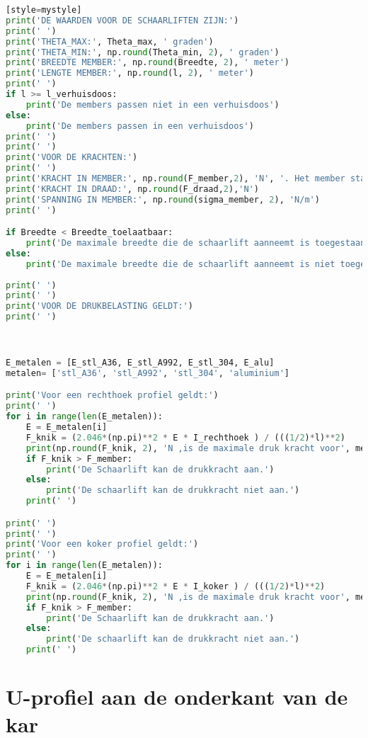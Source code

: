 \begin{lstlisting}[language=Python][style=mystyle]
print('DE WAARDEN VOOR DE SCHAARLIFTEN ZIJN:')
print(' ')
print('THETA_MAX:', Theta_max, ' graden')
print('THETA_MIN:', np.round(Theta_min, 2), ' graden')
print('BREEDTE MEMBER:', np.round(Breedte, 2), ' meter')
print('LENGTE MEMBER:', np.round(l, 2), ' meter')
print(' ')
if l >= l_verhuisdoos:
    print('De members passen niet in een verhuisdoos')
else:
    print('De members passen in een verhuisdoos')
print(' ')
print(' ')
print('VOOR DE KRACHTEN:')
print(' ')
print('KRACHT IN MEMBER:', np.round(F_member,2), 'N', '. Het member staat in druk.')
print('KRACHT IN DRAAD:', np.round(F_draad,2),'N')
print('SPANNING IN MEMBER:', np.round(sigma_member, 2), 'N/m')
print(' ')

if Breedte < Breedte_toelaatbaar:
    print('De maximale breedte die de schaarlift aanneemt is toegestaan.')
else:
    print('De maximale breedte die de schaarlift aanneemt is niet toegestaan')
    
print(' ')
print(' ')
print('VOOR DE DRUKBELASTING GELDT:')
print(' ')



E_metalen = [E_stl_A36, E_stl_A992, E_stl_304, E_alu]
metalen= ['stl_A36', 'stl_A992', 'stl_304', 'aluminium']

print('Voor een rechthoek profiel geldt:')
print(' ')
for i in range(len(E_metalen)):
    E = E_metalen[i]
    F_knik = (2.046*(np.pi)**2 * E * I_rechthoek ) / (((1/2)*l)**2)
    print(np.round(F_knik, 2), 'N ,is de maximale druk kracht voor', metalen[i])
    if F_knik > F_member:
        print('De Schaarlift kan de drukkracht aan.')
    else:
        print('De schaarlift kan de drukkracht niet aan.')
    print(' ')

print(' ')
print(' ')
print('Voor een koker profiel geldt:')
print(' ')
for i in range(len(E_metalen)):
    E = E_metalen[i]
    F_knik = (2.046*(np.pi)**2 * E * I_koker ) / (((1/2)*l)**2)
    print(np.round(F_knik, 2), 'N ,is de maximale druk kracht voor', metalen[i])
    if F_knik > F_member:
        print('De Schaarlift kan de drukkracht aan.')
    else:
        print('De schaarlift kan de drukkracht niet aan.')
    print(' ')

\end{lstlisting}
\vspace{\baselineskip}

\section{U-profiel aan de onderkant van de kar}
\label{se: onderkant_u-profiel}

